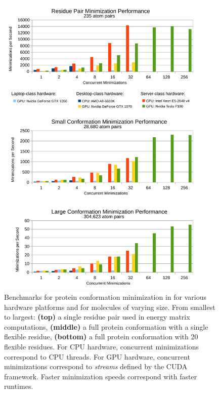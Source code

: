 \begin{figure}
\center
\includegraphics[width=4in]{figures/gpu.pdf}
\caption{Benchmarks for protein conformation minimization in  for various hardware platforms and for molecules of varying size. From smallest to largest: {\bf (top)} a single residue pair used in energy matrix computations, {\bf (middle)} a full protein conformation with a single flexible residue, {\bf (bottom)} a full protein conformation with 20 flexible residues. For CPU hardware, concurrent minimizations correspond to CPU threads. For GPU hardware, concurrent minimizations correspond to {\it streams} defined by the CUDA framework. Faster minimization speeds correspond with faster \osprey runtimes.}
\label{fig:gpu}
\end{figure}
